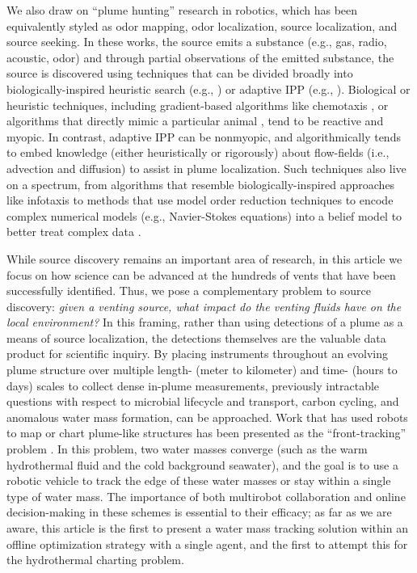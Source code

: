 We also draw on ``plume hunting'' research in robotics, which has been equivalently styled as odor mapping, odor localization, source localization, and source seeking. In these works, the source emits a substance (e.g., gas, radio, acoustic, odor) and through partial observations of the emitted substance, the source is discovered using techniques that can be divided broadly into biologically-inspired heuristic search (e.g., \autocite{reddy2022olfactory,chen2019odor}) or adaptive IPP (e.g., \autocite{salam2019adaptive}). Biological or heuristic techniques, including gradient-based algorithms like chemotaxis \autocite{morse1998robust}, or algorithms that directly mimic a particular animal \autocite{edwards2001representing}, tend to be reactive and myopic. In contrast, adaptive IPP can be nonmyopic, and algorithmically tends to embed knowledge (either heuristically or rigorously) about flow-fields (i.e., advection and diffusion) to assist in plume localization. Such techniques also live on a spectrum, from algorithms that resemble biologically-inspired approaches like infotaxis \autocite{vergassola2007infotaxis} to methods that use model order reduction techniques to encode complex numerical models (e.g., Navier-Stokes equations) into a belief model to better treat complex data \autocite{peng2014dynamic}.

While source discovery remains an important area of research, in this article we focus on how science can be advanced at the hundreds of vents that have been successfully identified. Thus, we pose a complementary problem to source discovery: \emph{given a venting source, what impact do the venting fluids have on the local environment?} In this framing, rather than using detections of a plume as a means of source localization, the detections themselves are the valuable data product for scientific inquiry. By placing instruments throughout an evolving plume structure over multiple length- (meter to kilometer) and time- (hours to days) scales to collect dense in-plume measurements, previously intractable questions with respect to microbial lifecycle and transport, carbon cycling, and anomalous water mass formation, can be approached. Work that has used robots to map or chart plume-like structures has been presented as the ``front-tracking'' problem \autocite{li2014multi,chen2019odor}. In this problem, two water masses converge (such as the warm hydrothermal fluid and the cold background seawater), and the goal is to use a robotic vehicle to track the edge of these water masses or stay within a single type of water mass. The importance of both multirobot collaboration and online decision-making in these schemes is essential to their efficacy; as far as we are aware, this article is the first to present a water mass tracking solution within an offline optimization strategy with a single agent, and the first to attempt this for the hydrothermal charting problem.


